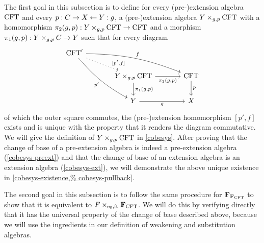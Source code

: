 The first goal in this subsection is to define for every (pre-)extension algebra 
$\mathrm{CFT}$ and every $p:C\rightarrow X\leftarrow Y:g$, a (pre-)extension
algebra $\cobesys{Y}{\stesys}{g}{p}$ with a homomorphism $\pullbackpr{2}{g}{p}:
\cobesys{Y}{\stesys}{g}{p}\to\stesys$ and a morphism $\pullbackpr{1}{g}{p}:
\pullback{Y}{\stesysc}{g}{p}\to Y$ such that for every diagram
\begin{equation*}
\begin{tikzcd}[column sep=large]
\stesys'
  \ar[bend right=10]{ddr}[swap]{p'}
  \ar[bend left=10]{rrd}{f}
  \ar[dotted]{dr}[near end]{[p',f]}
  \\
  {}&
\cobesys{Y}{\stesys}{g}{p}
  \ar{d}{\pullbackpr{1}{g}{p}}
  \ar{r}[swap]{\pullbackpr{2}{g}{p}}
  &
\stesys
  \ar{d}{p}
  \\
  {}&
Y \ar{r}[swap]{g}
  &
X
\end{tikzcd}
\end{equation*}
of which the outer square commutes, the (pre-)extension homomorphism $[p',f]$ exists
and is unique with the property that it renders the diagram commutative. We will
give the definition of $\cobesys{Y}{\stesys}{g}{p}$ in \autoref{cobesys}. After
proving that the change of base of a pre-extension algebra is indeed a
pre-extension algebra (\autoref{cobesys-preext}) and that the change of base
of an extension algebra is an extension algebra (\autoref{cobesys-ext}), we
will demonstrate the above unique existence in \autoref{cobesys-existence,%
cobesys-pullback}.

The second goal in this subsection is to follow the same procedure for
$\mathbf{F}_{\mathbf{F}_{\mathrm{CFT}}}$ to show that it is equivalent to
$\cobesys{\stesysf}{\famesys{\stesys}}{\ectxext}{\eft}$. We will do this by
verifying directly that it has the universal property of the change of base
described above, because we will use the ingredients in our definition of
weakening and substitution algebras.

